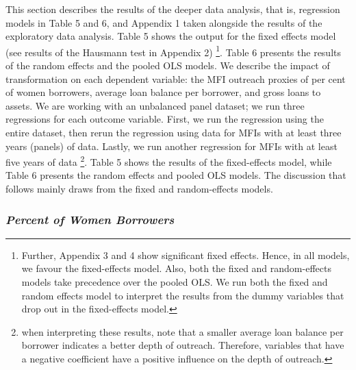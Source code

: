 \documentclass[a4paper,nobind]{templates/ociamthesis}
\begin{document}
This section describes the results of the deeper data analysis, that is, regression models in Table 5 and 6, and Appendix 1 taken alongside the results of the exploratory data analysis. Table 5 shows the output for the fixed effects model (see results of the Hausmann test in Appendix 2) \footnote{Further, Appendix 3 and 4 show significant fixed effects. Hence, in all models, we favour the fixed-effects model. Also, both the fixed and random-effects models take precedence over the pooled OLS. We run both the fixed and random effects model to interpret the results from the dummy variables that drop out in the fixed-effects model.}. Table 6 presents the results of the random effects and the pooled OLS models. We describe the impact of transformation on each dependent variable: the MFI outreach proxies of per cent of women borrowers, average loan balance per borrower, and gross loans to assets. We are working with an unbalanced panel dataset; we run three regressions for each outcome variable. First, we run the regression using the entire dataset, then rerun the regression using data for MFIs with at least three years (panels) of data. Lastly, we run another regression for MFIs with at least five years of data \footnote{when interpreting these results, note that a smaller average loan balance per borrower indicates a better depth of outreach. Therefore, variables that have a negative coefficient have a positive influence on the depth of outreach.}. Table 5 shows the results of the fixed-effects model, while Table 6 presents the random effects and pooled OLS models. The discussion that follows mainly draws from the fixed and random-effects models.

\hypertarget{percent-of-women-borrowers}{%
\subsubsection{\texorpdfstring{\textbf{\emph{Percent of Women Borrowers}}}{Percent of Women Borrowers}}\label{percent-of-women-borrowers}}
\end{document}
